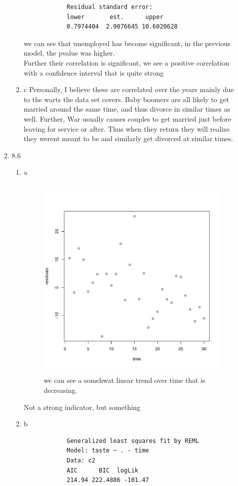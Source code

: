 \documentclass[11pt]{article}
\begin{document}
\begin{enumerate}
\begin{enumerate}
\begin{enumerate}
\begin{verbatim}
			Residual standard error:
			lower       est.      upper 
			0.7974404  2.9076645 10.6020628 
		\end{verbatim}
		we can see that unemployed has become significant, in the previous model, the pvalue was higher.
		\\
		Further their correlation is significant, we see a positive correlation with a confidence interval that is quite strong
		\item c
		Personally, I believe these are correlated over the years mainly due to the warts the data set covers. Baby boomers are all likely to get married around the same time, and thus divorce in similar times as well. Further, War usually causes couples to get married just before leaving for service or after. Thus when they return they will realize they werent meant to be and similarly get divorced at similar times. 
	\end{enumerate}
	\item 8.6
	\begin{enumerate}
		\item a
		\begin{figure}[H]
			\centering
			\includegraphics[width=10cm,height=10cm]{ovtc.pdf}
			\caption[paic]{we can see a somehwat linear trend over time that is decreasing.}
			\label{ovtc}
		\end{figure}
		Not a strong indicator, but something
		\item b
		\begin{verbatim}
			Generalized least squares fit by REML
			Model: taste ~ . - time 
			Data: c2 
			AIC      BIC  logLik
			214.94 222.4886 -101.47
			

\end{verbatim}
\end{enumerate}
\end{enumerate}
\end{enumerate}
\end{document}
